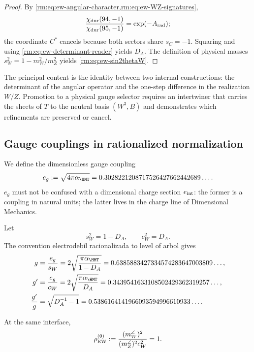 \begin{proof}
By \cref{rm:eq:ew-angular-character,rm:eq:ew-WZ-signatures},
\[
\frac{\chi_{\rm dur}(94,-1)}{\chi_{\rm dur}(95,-1)}
=\exp(-A_{\rm rad});
\]
the coordinate \(C^*\) cancels because both sectors share
\(s_C=-1\). Squaring and using
\cref{rm:eq:ew-determinant-reader} yields \(D_A\). The definition
of physical masses \(s_W^2=1-m_W^2/m_Z^2\) yields
\cref{rm:eq:ew-sin2thetaW}.
\end{proof}

The principal content is the identity between two internal constructions: the determinant of the angular operator and the one-step difference in the realization \(W/Z\). Promotion to a physical gauge selector requires an intertwiner that carries the sheets of \(T\) to the neutral basis \((W^3,B)\) and demonstrates which refinements are preserved or cancel.

\subsection{Gauge couplings in rationalized normalization}

We define the dimensionless gauge coupling
\begin{equation}
\label{rm:eq:ew-egauge}
e_g:=\sqrt{4\pi\alpha_{\HMT}}
=0.3028221208717526427662442689\ldots .
\end{equation}
\(e_g\) must not be confused with a dimensional charge section
\(e_{\rm int}\): the former is a coupling in natural units; the
latter lives in the charge line of Dimensional Mechanics.

Let
\begin{equation}
\label{rm:eq:ew-sw-cw}
s_W^2=1-D_A,
\qquad
c_W^2=D_A.
\end{equation}
The convention electrodebil racionalizada to level of arbol gives
\begin{align}
g&=\frac{e_g}{s_W}
=2\sqrt{\frac{\pi\alpha_{\HMT}}{1-D_A}}
=0.6385883427334574283647003809\ldots,
\label{rm:eq:ew-g}\\
g'&=\frac{e_g}{c_W}
=2\sqrt{\frac{\pi\alpha_{\HMT}}{D_A}}
=0.3439541633108502429362319257\ldots,
\label{rm:eq:ew-gprime}\\
\frac{g'}{g}
&=\sqrt{D_A^{-1}-1}
=0.5386164141966093594996610933\ldots .
\label{rm:eq:ew-gprime-over-g}
\end{align}

\begin{proposition}
\label{rm:prop:ew-rho}
At the same interface,
\begin{equation}
\label{rm:eq:ew-rho}
\rho_{\rm EW}^{(0)}
:=\frac{(m_W^{\angle})^2}
{(m_Z^{\angle})^2c_W^2}=1.
\end{equation}
\end{proposition}

